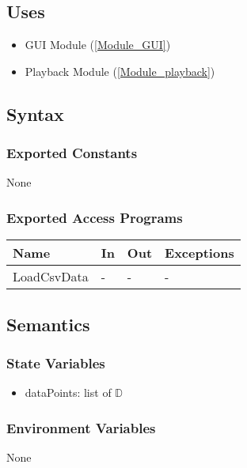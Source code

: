 \documentclass[12pt, titlepage]{article}
\begin{document}
\subsection{Uses}

\begin{itemize}
  \item GUI Module (\ref{Module_GUI})
  \item Playback Module (\ref{Module_playback})
\end{itemize}

\subsection{Syntax}

\subsubsection{Exported Constants}
None

\subsubsection{Exported Access Programs}

\begin{center}
\begin{tabular}{p{2cm} p{4cm} p{4cm} p{2cm}}
\hline
\textbf{Name} & \textbf{In} & \textbf{Out} & \textbf{Exceptions} \\
\hline
LoadCsvData & - & - & - \\
\hline
\end{tabular}
\end{center}

\subsection{Semantics}

\subsubsection{State Variables}

\begin{itemize}
  \item dataPoints: list of $\mathbb{D}$ 
\end{itemize}

\subsubsection{Environment Variables}
None
\end{document}
